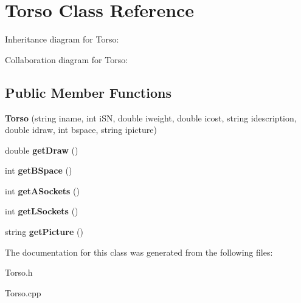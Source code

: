 \hypertarget{classTorso}{}\section{Torso Class Reference}
\label{classTorso}


Inheritance diagram for Torso\+:


Collaboration diagram for Torso\+:
\subsection*{Public Member Functions}
\begin{DoxyCompactItemize}
\item 
{\bfseries Torso} (string iname, int i\+SN, double iweight, double icost, string idescription, double idraw, int bspace, string ipicture)\hypertarget{classTorso_a63e5e65d1ee971aee3596d1c641f144d}{}\label{classTorso_a63e5e65d1ee971aee3596d1c641f144d}

\item 
double {\bfseries get\+Draw} ()\hypertarget{classTorso_a2e08e5c7930d5e80c20b021321fbaacf}{}\label{classTorso_a2e08e5c7930d5e80c20b021321fbaacf}

\item 
int {\bfseries get\+B\+Space} ()\hypertarget{classTorso_a7dbbd58793a196fdc121bf9ef6a3b381}{}\label{classTorso_a7dbbd58793a196fdc121bf9ef6a3b381}

\item 
int {\bfseries get\+A\+Sockets} ()\hypertarget{classTorso_a2c77fe3f461c27400740c9bce4121fcf}{}\label{classTorso_a2c77fe3f461c27400740c9bce4121fcf}

\item 
int {\bfseries get\+L\+Sockets} ()\hypertarget{classTorso_ada7f9c1bf6015925616462f35e6ec28c}{}\label{classTorso_ada7f9c1bf6015925616462f35e6ec28c}

\item 
string {\bfseries get\+Picture} ()\hypertarget{classTorso_ac3e07e761662390a2cd3917a48c946ca}{}\label{classTorso_ac3e07e761662390a2cd3917a48c946ca}

\end{DoxyCompactItemize}


The documentation for this class was generated from the following files\+:\begin{DoxyCompactItemize}
\item 
Torso.\+h\item 
Torso.\+cpp\end{DoxyCompactItemize}
